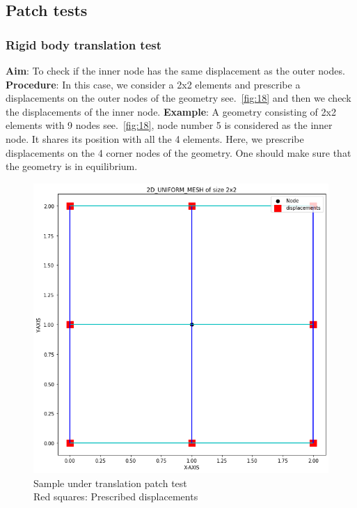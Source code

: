 \documentclass[fleqn, 12.5pt,a4paper]{report}
\begin{document}
\subsection{\large Patch tests}
\subsubsection{Rigid body translation test}
\textbf{Aim}: To check if the inner node has the same displacement as the outer nodes.\newline
\textbf{Procedure}: In this case, we consider a 2x2 elements and prescribe a displacements on the outer nodes of the geometry see.~\autoref{fig:18} and then we check the displacements of the inner node.\newline
\textbf{Example}: A geometry consisting of 2x2 elements with 9 nodes see.~\autoref{fig:18}, node number 5 is considered as the inner node. It shares its position with all the 4 elements. Here, we prescribe displacements on the 4 corner nodes of the geometry. One should make sure that the geometry is in equilibrium.
\begin{figure}[h]
    \centering
    \includegraphics[scale=0.40]{2x2 disp.png}
    \caption{Sample under translation patch test\\ Red squares:             Prescribed displacements}
    \label{fig:18}
\end{figure}
\end{document}
